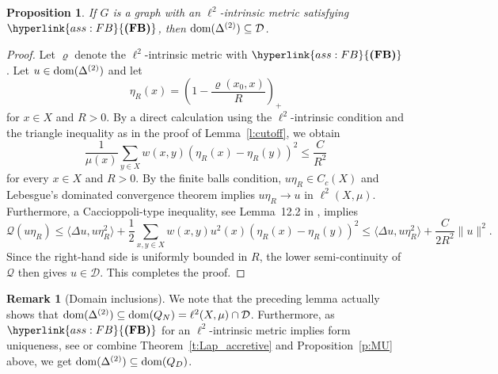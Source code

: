 \documentclass[letterpaper]{article}
\newtheorem{proposition}[lemma]{Proposition}
\theoremstyle{definition}
\newtheorem{remark}[lemma]{Remark}
\theoremstyle{named}
\numberwithin{equation}{section}
\newcommand{\FB}{\hyperlink{ass:FB}{\textup{\textbf{(FB)}}}}
\newcommand{\Q}{\mathcal{Q}}
\newcommand{\D}{\mathcal{D}}
\newcommand{\dom}{\textnormal{dom}} %
\begin{document}
\begin{proposition}\label{p:energy}
If $G$ is a graph with an $\ell^2$-intrinsic metric satisfying $\FB$, then
$\dom(\Delta^{(2)}) \subseteq \D$.
\end{proposition}
\begin{proof}
Let $\varrho$ denote the $\ell^2$-intrinsic metric with $\FB$.
Let $u \in \dom(\Delta^{(2)})$ and let
$$\eta_R(x) = \left(1 - \frac{\varrho(x_0, x)}{R} \right)_+$$
for $x \in X$ and $R >0$.
By a direct calculation using the $\ell^2$-intrinsic condition and the triangle inequality as in
the proof of Lemma~\ref{l:cutoff}, we obtain
$$\frac{1}{\mu(x)} \sum_{y \in X} w(x,y) (\eta_R(x)-\eta_R(y))^2 \leq \frac{C}{R^2}$$
for every $x\in X$ and $R > 0$.
By the finite balls condition, $u\eta_R \in C_c(X)$ and Lebesgue's dominated convergence theorem implies
$u\eta_R \to u$ in $\ell^2(X,\mu)$. Furthermore, a Caccioppoli-type
inequality, see Lemma~12.2 in \cite{keller2021graphs}, implies
$$\Q(u\eta_R)\leq \langle \Delta u, u \eta_R^2\rangle + \frac{1}{2} \sum_{x,y \in X}w(x,y) u^2(x) (\eta_R(x)-\eta_R(y))^2
\leq\langle \Delta u, u \eta_R^2\rangle+ \frac{C}{2R^2} \|u\|^2. $$
Since the right-hand side is uniformly bounded in $R$, the lower semi-continuity of $\Q$ then gives $u \in \D$. This completes the proof.
\end{proof}
\begin{remark}[Domain inclusions]
We note that the preceding lemma actually shows that $\dom(\Delta^{(2)}) \subseteq \dom(Q_N) = \ell^2(X,\mu) \cap \D$.
Furthermore, as $\FB$ for an $\ell^2$-intrinsic metric implies form uniqueness, see \cite[Theorem~12.7]{keller2021graphs}
or combine Theorem~\ref{t:Lap_accretive} and Proposition~\ref{p:MU} above,
we get $\dom(\Delta^{(2)}) \subseteq \dom(Q_D)$.
\end{remark}
\end{document}
